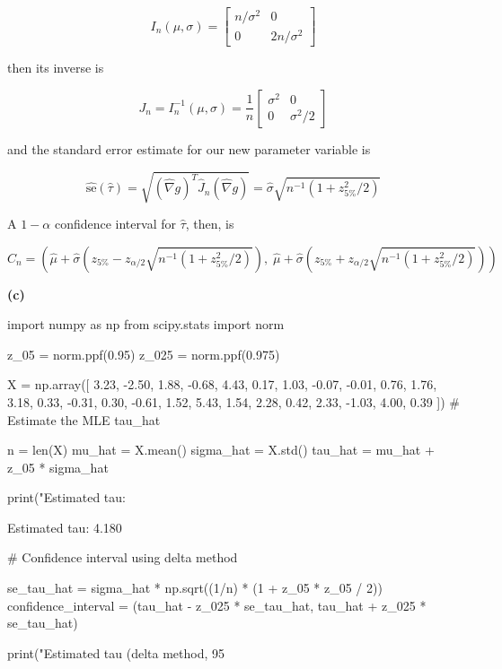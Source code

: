 \[ I_n(\mu, \sigma) = \begin{bmatrix}
n / \sigma^2 & 0 \\
0 & 2n / \sigma^2
\end{bmatrix}
\]

then its inverse is

\[ J_n = I_n^{-1}(\mu, \sigma) = \frac{1}{n} \begin{bmatrix}
\sigma^2 & 0 \\
0 & \sigma^2/2
\end{bmatrix}
\]

and the standard error estimate for our new parameter variable is

\[\hat{\text{se}}(\hat{\tau}) = \sqrt{(\hat{\nabla} g)^T \hat{J}_n (\hat{\nabla} g)} = \hat{\sigma} \sqrt{n^{-1}(1 + z_{5\%}^2 / 2)}\]

A \(1 - \alpha\) confidence interval for \(\hat{\tau}\), then, is

\[ C_n = \left(
\hat{\mu} + \hat{\sigma}\left( z_{5\%} - z_{\alpha / 2} \sqrt{n^{-1}(1 + z_{5\%}^2 / 2)} \right), \;
\hat{\mu} + \hat{\sigma}\left( z_{5\%} + z_{\alpha / 2} \sqrt{n^{-1}(1 + z_{5\%}^2 / 2)} \right) \right) \]

\textbf{(c)}

\begin{python}
import numpy as np
from scipy.stats import norm

z_05 = norm.ppf(0.95)
z_025 = norm.ppf(0.975)
\end{python}

\begin{python}
X = np.array([
    3.23, -2.50,  1.88, -0.68,  4.43, 0.17,
    1.03, -0.07, -0.01,  0.76,  1.76, 3.18,
    0.33, -0.31,  0.30, -0.61,  1.52, 5.43,
    1.54,  2.28,  0.42,  2.33, -1.03, 4.00,
    0.39   
])
# Estimate the MLE tau_hat

n = len(X)
mu_hat = X.mean()
sigma_hat = X.std()
tau_hat = mu_hat + z_05 * sigma_hat

print("Estimated tau: %
\end{python}

\begin{console}
Estimated tau: 4.180
\end{console}

\begin{python}
# Confidence interval using delta method

se_tau_hat = sigma_hat * np.sqrt((1/n) * (1 + z_05 * z_05 / 2))
confidence_interval = (tau_hat - z_025 * se_tau_hat, tau_hat + z_025 * se_tau_hat)

print("Estimated tau (delta method, 95%
\end{python}

